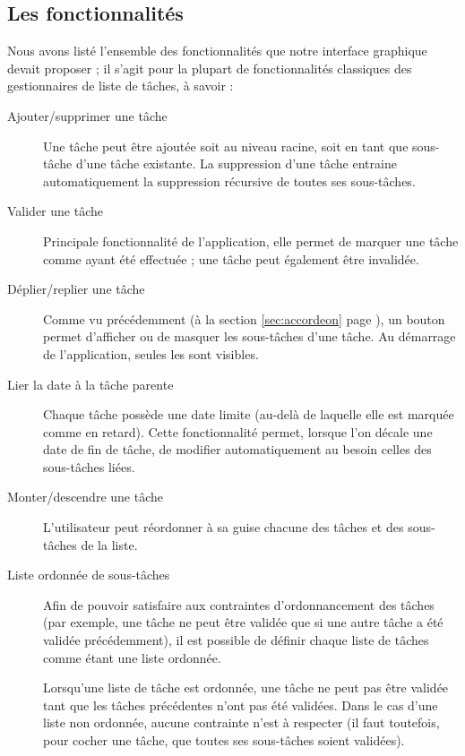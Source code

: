 \documentclass[11pt]{article}
\begin{document}
\subsection{Les fonctionnalités}

Nous avons listé l'ensemble des fonctionnalités que notre interface
graphique devait proposer ; il s'agit pour la plupart de
fonctionnalités classiques des gestionnaires de liste de tâches, à
savoir :
\begin{description}
\item[Ajouter/supprimer une tâche] Une tâche peut être ajoutée soit au
  niveau racine, soit en tant que sous-tâche d'une tâche existante. La
  suppression d'une tâche entraine automatiquement la suppression
  récursive de toutes ses sous-tâches.
\item[Valider une tâche] Principale fonctionnalité de l'application,
  elle permet de marquer une tâche comme ayant été effectuée ; une
  tâche peut également être invalidée.
\item[Déplier/replier une tâche] Comme vu précédemment (à la section
  \ref{sec:accordeon} page \pageref{sec:accordeon}), un bouton permet
  d'afficher ou de masquer les sous-tâches d'une tâche. Au démarrage
  de l'application, seules les  sont visibles.
\item[Lier la date à la tâche parente] Chaque tâche possède une date
  limite (au-delà de laquelle elle est marquée comme en retard). Cette
  fonctionnalité permet, lorsque l'on décale une date de fin de tâche,
  de modifier automatiquement au besoin celles des sous-tâches liées.
\item[Monter/descendre une tâche] L'utilisateur peut réordonner à sa
  guise chacune des tâches et des sous-tâches de la liste.
\item[Liste ordonnée de sous-tâches] Afin de pouvoir satisfaire aux
  contraintes d'ordonnancement des tâches (par exemple, une tâche ne
  peut être validée que si une autre tâche a été validée
  précédemment), il est possible de définir chaque liste de tâches
  comme étant une liste ordonnée.

  Lorsqu'une liste de tâche est ordonnée, une tâche ne peut pas être
  validée tant que les tâches précédentes n'ont pas été validées. Dans
  le cas d'une liste non ordonnée, aucune contrainte n'est à respecter
  (il faut toutefois, pour cocher une tâche, que toutes ses
  sous-tâches soient validées).
\end{description}
\end{document}
